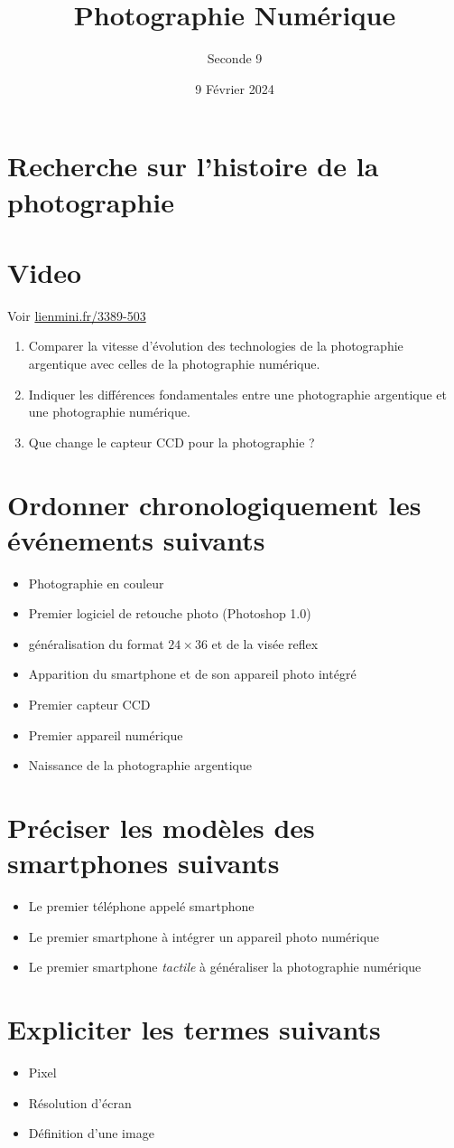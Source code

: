 \documentclass{article}
\title{Photographie Numérique}
\date{9 Février 2024}
\author{Seconde 9}
\begin{document}
\maketitle

\section*{Recherche sur l'histoire de la photographie}
\section{Video}
Voir \url{lienmini.fr/3389-503}
\begin{enumerate}
\item Comparer la vitesse d'évolution des technologies de la photographie argentique avec celles de la photographie numérique.
\item Indiquer les différences fondamentales entre une photographie argentique et une photographie numérique.
\item Que change le capteur CCD pour la photographie ? 
\end{enumerate}
\section{Ordonner chronologiquement les événements suivants}
\begin{itemize}
\item Photographie en couleur
\item Premier logiciel de retouche photo (Photoshop 1.0)
\item généralisation du format $24 \times 36$ et de la visée reflex
\item Apparition du smartphone et de son appareil photo intégré
\item Premier capteur CCD
\item Premier appareil numérique
\item Naissance de la photographie argentique
\end{itemize}
\section{Préciser les modèles des smartphones suivants}
\begin{itemize}
\item Le premier téléphone appelé \og smartphone \fg
\item Le premier smartphone à intégrer un appareil photo numérique
\item Le premier smartphone \emph{tactile} à généraliser la photographie numérique  
\end{itemize}
\section{Expliciter les termes suivants}
\begin{itemize}
\item Pixel
\item Résolution d'écran
\item Définition d'une image
\end{itemize}
\end{document}
